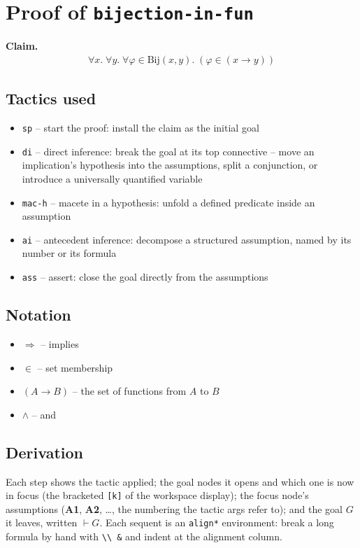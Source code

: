 \documentclass[11pt]{article}
\begin{document}
\section*{Proof of \texttt{bijection-in-fun}}
\textbf{Claim.}
\begin{align*}
  \forall x.\; \forall y.\; \forall \varphi \in \mathrm{Bij}(x, y).\; (\varphi \in (x \to y))
\end{align*}
\bigskip

\subsection*{Tactics used}
\begin{itemize}
\item \texttt{sp} -- start the proof: install the claim as the initial goal
\item \texttt{di} -- direct inference: break the goal at its top connective -- move an implication's hypothesis into the assumptions, split a conjunction, or introduce a universally quantified variable
\item \texttt{mac-h} -- macete in a hypothesis: unfold a defined predicate inside an assumption
\item \texttt{ai} -- antecedent inference: decompose a structured assumption, named by its number or its formula
\item \texttt{ass} -- assert: close the goal directly from the assumptions
\end{itemize}

\subsection*{Notation}
\begin{itemize}
\item $\Rightarrow$ -- implies
\item $\in$ -- set membership
\item $(A \to B)$ -- the set of functions from $A$ to $B$
\item $\wedge$ -- and
\end{itemize}

\subsection*{Derivation}
Each step shows the tactic applied; the goal nodes it opens and which one is now in focus (the bracketed \texttt{[k]} of the workspace display); the focus node's assumptions (\textbf{A1}, \textbf{A2}, \dots{}, the numbering the tactic args refer to); and the goal $G$ it leaves, written $\vdash G$.  Each sequent is an \texttt{align*} environment: break a long formula by hand with \texttt{\textbackslash\textbackslash\ \&} and indent at the alignment column.
\end{document}
